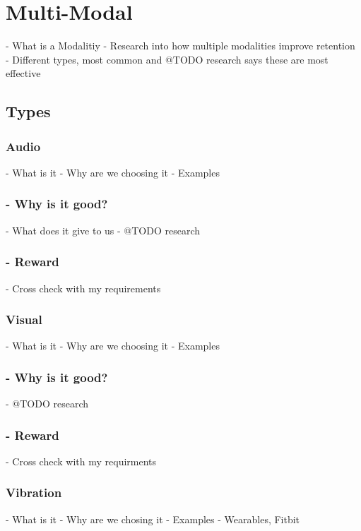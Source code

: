 \section{Multi-Modal}
  - What is a Modalitiy\newline
  - Research into how multiple modalities improve retention\newline
  - Different types, most common and @TODO research says these are most effective
  \subsection{Types}
  \subsubsection{Audio}
      - What is it\newline
      - Why are we choosing it\newline
      - Examples
      \subsubsection{- Why is it good?}
        - What does it give to us\newline
        - @TODO research
      \subsubsection{- Reward}
        - Cross check with my requirements
  \subsubsection{Visual}
      - What is it\newline
      - Why are we choosing it\newline
      - Examples
      \subsubsection{- Why is it good?}
        - @TODO research
      \subsubsection{- Reward}
        - Cross check with my requirments
  \subsubsection{Vibration}
      - What is it\newline
      - Why are we chosing it\newline
      - Examples\newline
      - Wearables, Fitbit
